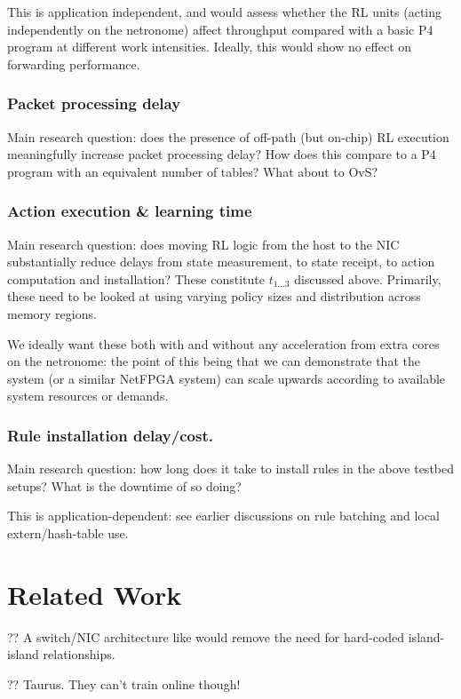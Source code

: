 \documentclass[sigconf,natbib=false]{acmart}
\begin{document}
This is application independent, and would assess whether the RL units (acting independently on the netronome) affect throughput compared with a basic P4 program at different work intensities.
Ideally, this would show no effect on forwarding performance.

\subsubsection{Packet processing delay}
Main research question: does the presence of off-path (but on-chip) RL execution meaningfully increase packet processing delay? How does this compare to a P4 program with an equivalent number of tables? What about to OvS?

\subsubsection{Action execution \& learning time}
Main research question: does moving RL logic from the host to the NIC substantially reduce delays from state measurement, to state receipt, to action computation and installation?
These constitute $t_{1...3}$ discussed above.
Primarily, these need to be looked at using varying policy sizes and distribution across memory regions.

We ideally want these both with and without any acceleration from extra cores on the netronome: the point of this being that we can demonstrate that the system (or a similar NetFPGA system) can scale upwards according to available system resources or demands.

\subsubsection{Rule installation delay/cost.}
Main research question: how long does it take to install rules in the above testbed setups? What is the downtime of so doing?

This is application-dependent: see earlier discussions on rule batching and local extern/hash-table use.

\section{Related Work}

?? A switch/NIC architecture like \textcite{DBLP:conf/hotnets/StephensAS18} would remove the need for hard-coded island-island relationships.

?? Taurus. They can't train online though!~\parencite{DBLP:journals/corr/abs-2002-08987}
\end{document}
